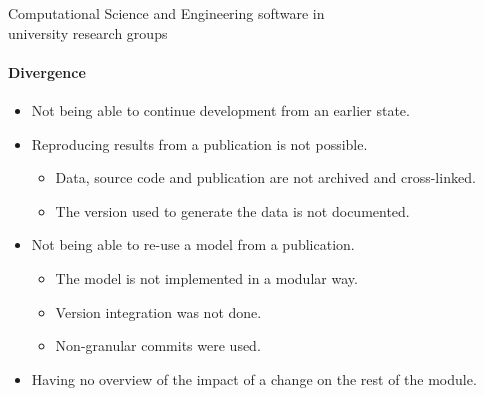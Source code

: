 \documentclass[
	ngerman,%
	aspectratio=169,%
	color={accentcolor=2d},
	logo=true,%
	colorframetitle=true,%
	]{tudabeamer}
\begin{document}
\begin{frame}{Computational Science and Engineering software in\\university research groups}
	\framesubtitle{Divergence}
	
	\vfill
	\begin{itemize}
            \item Not being able to continue development from an earlier state.
            \item Reproducing results from a publication is not possible.  
                \begin{itemize}
                    \item Data, source code and publication are not archived and cross-linked. 
                    \item The version used to generate the data is not documented. 
                \end{itemize}
            \item Not being able to re-use a model from a publication. 
                \begin{itemize}
                    \item The model is not implemented in a modular way.
                    \item Version integration was not done.
                    \item Non-granular commits were used. 
                \end{itemize}
            \item Having no overview of the impact of a change on the rest of the module.
	\end{itemize}

	\medskip

\end{frame}



\end{document}

